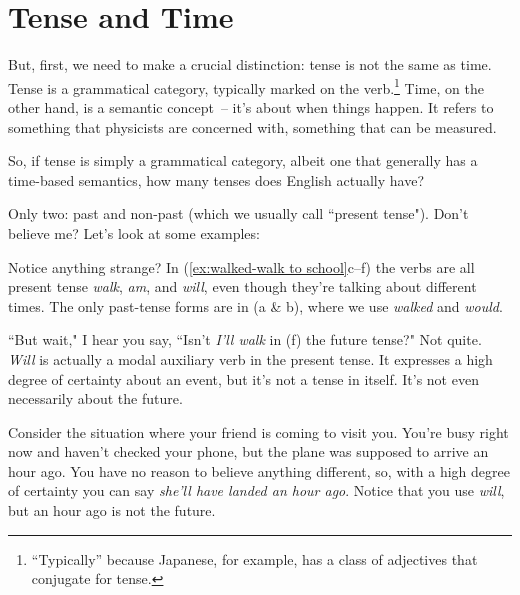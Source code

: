 \section{Tense and Time}\label{sec:tense-vs-time}

But, first, we need to make a crucial distinction: tense is not the same as time. Tense is a grammatical category, typically marked on the verb.\footnote{``Typically'' because Japanese, for example, has a class of adjectives that conjugate for tense.} Time, on the other hand, is a semantic concept~-- it's about when things happen. It refers to something that physicists are concerned with, something that can be measured.

So, if tense is simply a grammatical category, albeit one that generally has a time-based semantics, how many tenses does English actually have?

Only two: past and non-past (which we usually call ``present tense"). Don't believe me? Let's look at some examples:

Notice anything strange? In (\ref{ex:walked-walk to school}c--f) the verbs are all present tense \textit{walk}, \textit{am}, and \textit{will}, even though they're talking about different times. The only past-tense forms are in (a \& b), where we use \textit{walked} and \textit{would}.

``But wait," I hear you say, ``Isn't \textit{I'll walk} in (f) the future tense?" Not quite. \textit{Will} is actually a modal auxiliary verb in the present tense. It expresses a high degree of certainty about an event, but it's not a tense in itself. It's not even necessarily about the future.

Consider the situation where your friend is coming to visit you. You're busy right now and haven't checked your phone, but the plane was supposed to arrive an hour ago. You have no reason to believe anything different, so, with a high degree of certainty you can say \textit{she'll have landed an hour ago}. Notice that you use \textit{will}, but an hour ago is not the future.

